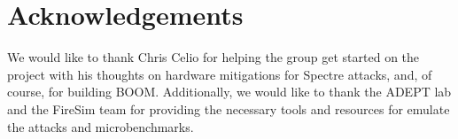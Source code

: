 \section{Acknowledgements}

We would like to thank Chris Celio for helping the group 
get started on the project with his thoughts on hardware mitigations for
Spectre attacks, and, of course, for building BOOM.
Additionally, we would like to thank the ADEPT lab and the FireSim
team for providing the necessary tools and resources for emulate the attacks and 
microbenchmarks.
